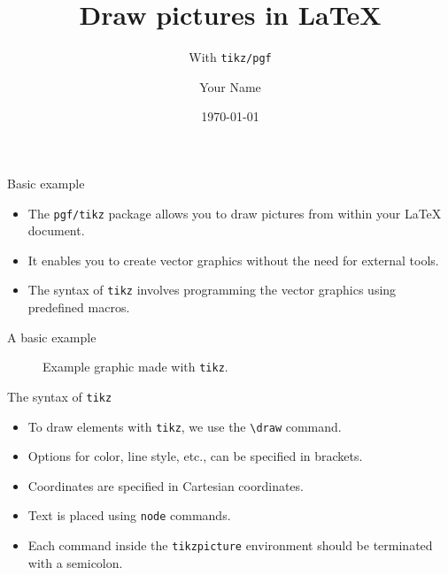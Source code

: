 \documentclass{beamer}
\title{Draw pictures in \LaTeX}
\subtitle{With \texttt{tikz/pgf}}
\author{Your Name}
\date{\today}
\begin{document}
\begin{frame}
  \titlepage
\end{frame}

\begin{frame}{Basic example}
  \begin{itemize}
    \item The \texttt{pgf/tikz} package allows you to draw pictures from within your \LaTeX{} document.
    \item It enables you to create vector graphics without the need for external tools.
    \item The syntax of \texttt{tikz} involves programming the vector graphics using predefined macros.
  \end{itemize}
\end{frame}

\begin{frame}{A basic example}
  \begin{figure}[h!]
    \begin{center}
      \caption{Example graphic made with \texttt{tikz}.}
    \end{center}
  \end{figure}
\end{frame}

\begin{frame}{The syntax of \texttt{tikz}}
  \begin{itemize}
    \item To draw elements with \texttt{tikz}, we use the \texttt{\textbackslash draw} command.
    \item Options for color, line style, etc., can be specified in brackets.
    \item Coordinates are specified in Cartesian coordinates.
    \item Text is placed using \texttt{node} commands.
    \item Each command inside the \texttt{tikzpicture} environment should be terminated with a semicolon.
  \end{itemize}
\end{frame}
\end{document}
